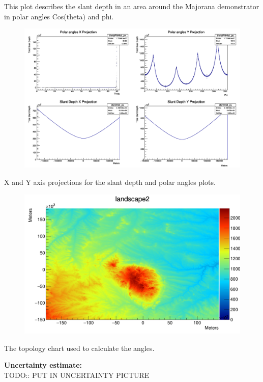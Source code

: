 \documentclass[a4paper,12pt]{article}
\begin{document}
This plot describes the slant depth in an area around the Majorana demonstrator in polar angles Cos(theta) and phi.

\begin{figure}[H]
\centering
\includegraphics[scale=0.3]{axisProjections.png}
\end{figure}

X and Y axis projections for the slant depth and polar angles plots.

\begin{figure}[H]
\centering
\includegraphics[scale=0.3]{Topology.png}
\end{figure}

The topology chart used to calculate the angles.

\pagebreak
\textbf{Uncertainty estimate:} \\
TODO:: PUT IN UNCERTAINTY PICTURE

\pagebreak
\end{document}

